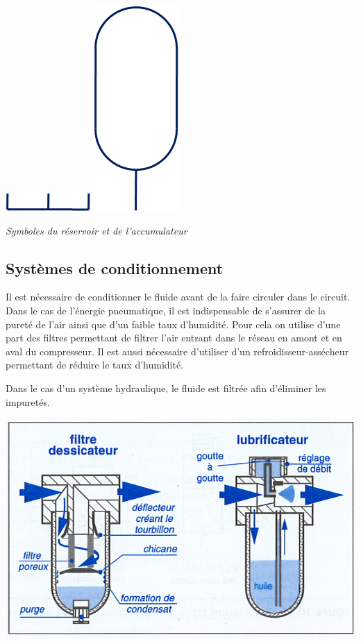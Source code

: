 \documentclass[10pt]{article}
\begin{document}
\begin{minipage}[c]{.3\textwidth}
\begin{center}
\includegraphics[width=.3\textwidth]{images/Symb_Reservoir}
\includegraphics[width=.2\textwidth]{images/Symb_Accumulateur}

\textit{Symboles du réservoir et de l'accumulateur}
\end{center}
\end{minipage}

\subsection{Systèmes de conditionnement}


\begin{minipage}[c]{.55\textwidth}
Il est nécessaire de conditionner le fluide avant de la faire circuler dans le circuit. Dans le cas de l'énergie pneumatique, il est indispensable de s'assurer de la pureté de l'air ainsi que d'un faible taux d'humidité. Pour cela on utilise d'une part des filtres permettant de filtrer l'air entrant dans le réseau en amont et en aval du compresseur. Il est aussi nécessaire d'utiliser d'un refroidisseur-assécheur permettant de réduire le taux d'humidité. 

Dans le cas d'un système hydraulique, le fluide est filtrée afin d'éliminer les impuretés.
\end{minipage} \hfill
\begin{minipage}[c]{.4\textwidth}
\begin{center}
\includegraphics[width=.95\textwidth]{images/fig8}
\end{center}
\end{minipage}
\end{document}
